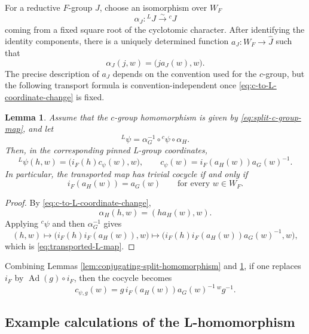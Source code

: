 \documentclass[reqno]{amsart}
\numberwithin{equation}{subsection}
\newcommand{\wh}[1]{\widehat{#1}}
\newcommand{\co}{\colon}
\newcommand{\ld}{{}^L}
\newcommand{\lc}{{}^c}
\DeclareMathOperator{\Ad}{Ad}
\newtheorem{lemma}[thm]{Lemma}
\theoremstyle{remark}
\numberwithin{equation}{subsection}
\numberwithin{figure}{subsection}
\begin{document}
For a reductive $F$-group $J$, choose an isomorphism over $W_F$
\[
\alpha_J\co\ld J\xrightarrow{\sim}\lc J
\]
coming from a fixed square root of the cyclotomic character.  After
identifying the identity components, there is a uniquely determined function
$a_J\co W_F\to\wh J$ such that
\begin{equation}\label{eq:c-to-L-coordinate-change}
\alpha_J(j,w)=\bigl(j a_J(w),w\bigr).
\end{equation}
The precise description of $a_J$ depends on the convention used for the
$c$-group, but the following transport formula is convention-independent
once \eqref{eq:c-to-L-coordinate-change} is fixed.

\begin{lemma}\label{lem:transport-c-to-L}
Assume that the $c$-group homomorphism is given by
\eqref{eq:split-c-group-map}, and let
\[
\ld\psi=\alpha_G^{-1}\circ\lc\psi\circ\alpha_H.
\]
Then, in the corresponding pinned L-group coordinates,
\begin{equation}\label{eq:transported-L-map}
\ld\psi(h,w)
=\bigl(i_F(h)c_\psi(w),w\bigr),
\qquad
c_\psi(w)=i_F(a_H(w))a_G(w)^{-1}.
\end{equation}
In particular, the transported map has trivial cocycle if and only if
\begin{equation}\label{eq:normalization-compatibility-criterion}
i_F(a_H(w))=a_G(w)
\qquad\text{for every }w\in W_F.
\end{equation}
\end{lemma}

\begin{proof}
By \eqref{eq:c-to-L-coordinate-change},
\[
\alpha_H(h,w)=(h a_H(w),w).
\]
Applying $\lc\psi$ and then $\alpha_G^{-1}$ gives
\[
(h,w)\longmapsto
\bigl(i_F(h)i_F(a_H(w)),w\bigr)
\longmapsto
\bigl(i_F(h)i_F(a_H(w))a_G(w)^{-1},w\bigr),
\]
which is \eqref{eq:transported-L-map}.
\end{proof}

Combining Lemmas \ref{lem:conjugating-split-homomorphism} and
\ref{lem:transport-c-to-L}, if one replaces $i_F$ by $\Ad(g)\circ i_F$, then the cocycle becomes
\begin{equation}\label{eq:coordinate-change-total-cocycle}
c_{\psi,g}(w)
=g\,i_F(a_H(w))a_G(w)^{-1}\,{}^w g^{-1}.
\end{equation}


\subsection{Example calculations of the L-homomorphism}
\label{ssec:explicit-L-group-calculations}
\end{document}

